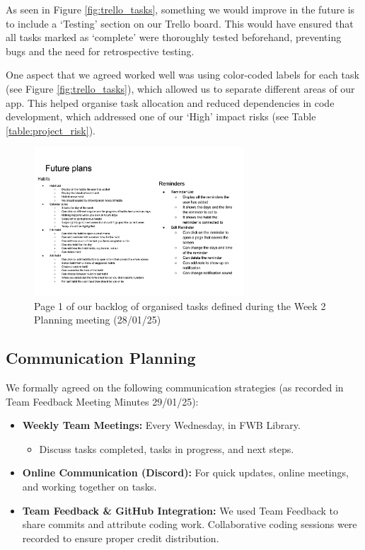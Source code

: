 As seen in Figure \ref{fig:trello_tasks}, something we would improve in the future is to include a ‘Testing’ section on our Trello board. This would have ensured that all tasks marked as ‘complete’ were thoroughly tested beforehand, preventing bugs and the need for retrospective testing.

One aspect that we agreed worked well was using color-coded labels for each task (see Figure \ref{fig:trello_tasks}), which allowed us to separate different areas of our app. This helped organise task allocation and reduced dependencies in code development, which addressed one of our ‘High’ impact risks (see Table \ref{table:project_risk}).

\begin{figure}[H]
    \centering
    \includegraphics[width=0.7\textwidth]{resources/task_list.pdf}
    \caption{Page 1 of our backlog of organised tasks defined during the Week 2 Planning meeting (28/01/25)}
    \label{fig:task_list}
\end{figure}

\subsection{Communication Planning}
We formally agreed on the following communication strategies (as recorded in Team Feedback Meeting Minutes 29/01/25):

\begin{itemize}
    \item \textbf{Weekly Team Meetings:} Every Wednesday, in FWB Library.
    \begin{itemize}
        \item Discuss tasks completed, tasks in progress, and next steps.
    \end{itemize}
    \item \textbf{Online Communication (Discord):} For quick updates, online meetings, and working together on tasks.
    \item \textbf{Team Feedback \& GitHub Integration:} We used Team Feedback to share commits and attribute coding work. Collaborative coding sessions were recorded to ensure proper credit distribution.
\end{itemize}

